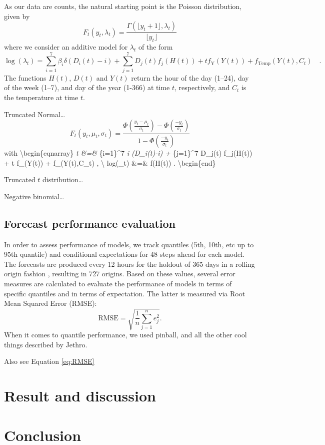 \documentclass[]{elsarticle} %
\begin{document}
As our data are counts, the natural starting point is the Poisson distribution, given by
\begin{equation}
  F_t(y_t,\lambda_t) =  \frac{\Gamma(\lfloor y_t + 1  \rfloor,\lambda_t)}{\lfloor y_t \rfloor}
\end{equation}
where we consider an additive model for \(\lambda_t\) of the form
\begin{equation}
  \log(\lambda_t) = \sum_{i=1}^7 \beta_i \delta(D_i(t)-i) + \sum_{j=1}^7 D_j(t) f_j(H(t)) + t f_\text{Y}(Y(t)) + f_\text{Temp}(Y(t),C_t) \quad .
\end{equation}
The functions \(H(t)\), \(D(t)\) and \(Y(t)\) return the hour of the day (1--24), day of the week (1--7), and day of the year (1-366) at time \(t\), respectively, and \(C_t\) is the temperature at time \(t\).

Truncated Normal\ldots{}
\begin{equation}
  F_t(y_t,\mu_t,\sigma_t) =  \frac{\Phi\left( \frac{y_t-\mu_t}{\sigma_t} \right) - \Phi\left( \frac{-y_t}{\sigma_t} \right)}{1 - \Phi\left( \frac{-y_t}{\sigma_t} \right)}
\end{equation}
with
\textbackslash begin\{eqnarray\}
\mu\emph{t \&=\& \sum}\{i=1\}\^{}7 \beta\emph{i \delta(D\_i(t)-i) + \sum}\{j=1\}\^{}7 D\_j(t) f\_j(H(t)) + t f\_(Y(t)) + f\_(Y(t),C\_t) \quad , \textbackslash{}
log(\sigma\_t) \&=\& f(H(t)) \quad .
\textbackslash begin\{end\}

Truncated \(t\) distribution\ldots{}

Negative binomial\ldots{}

\hypertarget{accuracy}{%
\subsection{Forecast performance evaluation}\label{accuracy}}

In order to assess performance of models, we track quantiles (5th, 10th, etc up to 95th quantile) and conditional expectations for 48 steps ahead for each model. The forecasts are produced every 12 hours for the holdout of 365 days in a rolling origin fashion \citep{Tashman2000}, resulting in 727 origins. Based on these values, several error measures are calculated to evaluate the performance of models in terms of specific quantiles and in terms of expectation. The latter is measured via Root Mean Squared Error (RMSE):
\begin{equation}
  \mathrm{RMSE} = \sqrt{\frac{1}{n} \sum_{j=1}^n e_j^2} .
  \label{eq:RMSE}
\end{equation}
When it comes to quantile performance, we used pinball, and all the other cool things described by Jethro.

Also see Equation \eqref{eq:RMSE}

\hypertarget{result}{%
\section{Result and discussion}\label{result}}

\hypertarget{conclusion}{%
\section{Conclusion}\label{conclusion}}

\renewcommand\refname{References}

\end{document}
